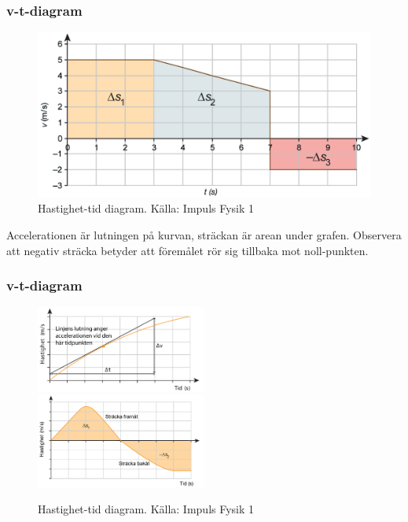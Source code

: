 \documentclass[11pt]{beamer}
\begin{document}
        \begin{frame}
            \frametitle{v-t-diagram}

        \begin{figure}[!h]
            \includegraphics[width=\textwidth]{../images/chapter3/velocityTime.png}
            \caption{Hastighet-tid diagram. Källa: Impuls Fysik 1}
        \end{figure}
        Accelerationen är lutningen på kurvan, sträckan är arean under grafen. Observera att negativ sträcka betyder att
        föremålet rör sig tillbaka mot noll-punkten.
            \end{frame}
    \begin{frame}
        \frametitle{v-t-diagram}

        \begin{figure}[!h]
            \includegraphics[width=0.5\textwidth]{../images/chapter3/velocityTimeAcceleration.png}
            \includegraphics[width=0.5\textwidth]{../images/chapter3/velocityTimeDist.png}
            \caption{Hastighet-tid diagram. Källa: Impuls Fysik 1}
        \end{figure}
        \end{frame}
\end{document}
